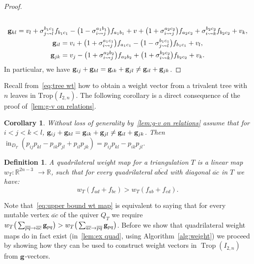 \documentclass[10pt,a4paper]{amsart}
\newcommand{\thlabel}[1]{\label{#1}}
\newcommand{\thref}[1]{\ref{#1}}
\newtheorem{Corollary}[Theorem]{Corollary}
\newtheorem{Definition}[Theorem]{Definition}
\numberwithin{equation}{section}
\DeclareMathOperator{\init}{in}
\DeclareMathOperator{\trop}{Trop}
\begin{document}
\begin{proof}
\begin{gather*}
\\
{\bf g}_{kl} = v_l + \sigma_{j\rightsquigarrow l}^{b_1c_1}f_{b_1c_1} - \big(1 - \sigma_{i\rightsquigarrow j}^{a_1b_1}\big)f_{a_1b_1} + v + \big(1+\sigma_{i\rightsquigarrow j}^{a_2c_2}\big)f_{a_2c_2} + \sigma_{i\rightsquigarrow k}^{b_2c_2}f_{b_2c_2} + v_k,
\\
{\bf g}_{il} = v_i + \big(1+\sigma_{i\rightsquigarrow j}^{a_1c_1}\big)f_{a_1c_1} - \big(1-\sigma_{j\rightsquigarrow l}^{b_1c_1}\big)f_{b_1c_1} + v_l,
\\
{\bf g}_{jk} = v_j - \big(1+\sigma_{i\rightsquigarrow j}^{a_2b_2}
\big)f_{a_2b_2} + \big(1 +\sigma_{i\rightsquigarrow k}^{b_2c_2}\big)f_{b_2c_2} + v_k.
\end{gather*}
In particular, we have ${\bf g}_{ij}+{\bf g}_{kl}={\bf g}_{ik}+{\bf g}_{jl}\not = {\bf g}_{il}+{\bf g}_{jk}$.
\end{proof}

Recall from~\eqref{eq:tree wt} how to obtain a weight vector from a trivalent tree with $n$ leaves in $\text{Trop}(I_{2,n})$.
The following corollary is a direct consequence of the proof of~\thref{lem:g-v on relations}.
\begin{Corollary}\thlabel{cor:trop and g}
Without loss of generality by~\thref{lem:g-v on relations} assume that for $i<j<k<l$, ${\bf g}_{ij}+{\bf g}_{kl}={\bf g}_{ik}+{\bf g}_{jl}\not = {\bf g}_{il}+{\bf g}_{jk}$.
Then %
$\init_{D_{T}}(p_{ij}p_{kl}-p_{ik}p_{jl}+p_{il}p_{jk})=p_{ij}p_{kl}-p_{ik}p_{jl}$.
\end{Corollary}

\begin{Definition}\thlabel{def:wt map}
A {\it quadrilateral weight map} for a triangulation $T$ is a linear map $w_T: \mathbb R^{2n-3}$ $\to \mathbb R$, such that for every quadrilateral $\overline{abcd}$ with diagonal $\overline{ac}$ in $T$ we have:
\begin{equation}\label{eq:upper bound wt map}
w_T(f_{ad}+f_{bc})>w_T(f_{ab}+f_{cd}).
\end{equation}
\end{Definition}
Note that~\eqref{eq:upper bound wt map} is equivalent to saying that for every mutable vertex $\overline{ac}$ of the quiver $Q_T$ we require
$w_T\big(\sum_{\overline{pq}\to \overline{ac}} {\bf g}_{pq}\big)>w_T\big(\sum_{\overline{ac}\to \overline{pq}}{\bf g}_{pq}\big)$.
Before we show that quadrilateral weight maps do in fact exist (in~\thref{lem:ex quad}, using Algorithm~\ref{alg:weight})
we proceed by showing how they can be used to construct weight vectors in $\trop(I_{2,n})$ from ${\bf g}$-vectors.
\end{document}
